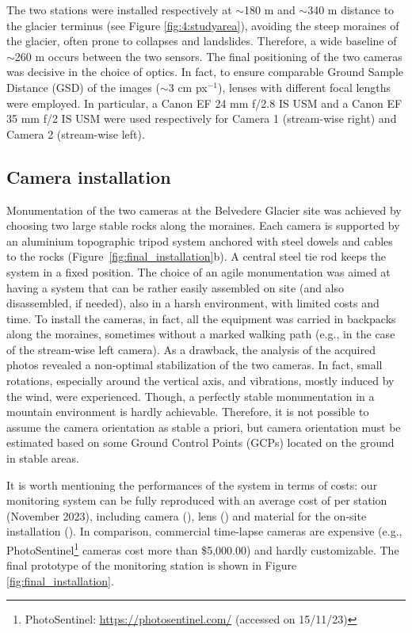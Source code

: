 The two stations were installed respectively at $\sim$180 m and $\sim$340 m distance to
the glacier terminus (see Figure \ref{fig:4:studyarea}), avoiding the steep moraines
of the glacier, often prone to collapses and landslides. Therefore, a wide baseline of
$\sim$260 m occurs between the two sensors.
The final positioning of the two cameras was decisive in the choice of optics.
In fact, to ensure comparable Ground Sample Distance (GSD) of the images ($\sim$3 cm
px$^{-1}$), lenses with different focal lengths were employed.
In particular, a Canon EF 24 mm f/2.8 IS USM and a Canon EF 35 mm f/2 IS USM were used
respectively for Camera 1 (stream-wise right) and Camera 2 (stream-wise left).

\subsection{Camera installation}\label{Monumentation}

Monumentation of the two cameras at the Belvedere Glacier site was achieved by choosing
two large stable rocks along the moraines.
Each camera is supported by an aluminium topographic tripod system anchored with steel
dowels and cables to the rocks (Figure~\ref{fig:final_installation}b).
A central steel tie rod keeps the system in a fixed position.
The choice of an agile monumentation was aimed at having a system that can be rather
easily assembled on site (and also disassembled, if needed), also in a harsh environment,
with limited costs and time.
To install the cameras, in fact, all the equipment was carried in backpacks along the
moraines, sometimes without a marked walking path (e.g., in the case of the stream-wise
left camera).
As a drawback, the analysis of the acquired photos revealed a non-optimal stabilization
of the two cameras.
In fact, small rotations, especially around the vertical axis, and vibrations, mostly
induced by the wind, were experienced.
Though, a perfectly stable monumentation in a mountain environment is hardly achievable.
Therefore, it is not possible to assume the camera orientation as stable a priori, but
camera orientation must be estimated based on some Ground Control Points (GCPs) located
on the ground in stable areas.

It is worth mentioning the performances of the system in terms of costs: our  monitoring
system can be fully reproduced with an average cost of  per station
(November 2023), including camera (), lens () and material for
the on-site installation ().
In comparison, commercial time-lapse cameras are expensive
(e.g., PhotoSentinel\footnote{PhotoSentinel: \url{https://photosentinel.com/} (accessed
  on 15/11/23)} cameras cost more than \$5,000.00) and hardly customizable.
The final prototype of the monitoring station is shown in Figure
\ref{fig:final_installation}.

